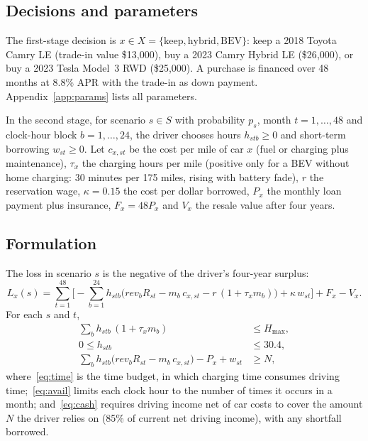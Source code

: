\documentclass[11pt]{article}
\begin{document}
\subsection{Decisions and parameters}

The first-stage decision is $x \in X = \{\text{keep}, \text{hybrid}, \text{BEV}\}$: keep a 2018 Toyota Camry LE (trade-in value \$13{,}000), buy a 2023 Camry Hybrid LE (\$26{,}000), or buy a 2023 Tesla Model~3 RWD (\$25{,}000). A purchase is financed over 48 months at 8.8\% APR with the trade-in as down payment. Appendix~\ref{app:params} lists all parameters.

In the second stage, for scenario $s \in S$ with probability $p_s$, month $t = 1,\dots,48$ and clock-hour block $b = 1,\dots,24$, the driver chooses hours $h_{stb} \geq 0$ and short-term borrowing $w_{st} \geq 0$. Let $c_{x,st}$ be the cost per mile of car $x$ (fuel or charging plus maintenance), $\tau_x$ the charging hours per mile (positive only for a BEV without home charging: 30 minutes per 175 miles, rising with battery fade), $r$ the reservation wage, $\kappa = 0.15$ the cost per dollar borrowed, $P_x$ the monthly loan payment plus insurance, $F_x = 48P_x$ and $V_x$ the resale value after four years.

\subsection{Formulation}

The loss in scenario $s$ is the negative of the driver's four-year surplus:
\begin{equation}\label{eq:loss}
L_x(s) = \sum_{t=1}^{48}\Big[-\sum_{b=1}^{24} h_{stb}\big(\mathit{rev}_b R_{st} - m_b\, c_{x,st} - r\,(1+\tau_x m_b)\big) + \kappa\, w_{st}\Big] + F_x - V_x .
\end{equation}
For each $s$ and $t$,
\begin{align}
\sum_{b} h_{stb}\,(1+\tau_x m_b) &\leq H_{\max}, \label{eq:time}\\
0 \leq h_{stb} &\leq 30.4, \label{eq:avail}\\
\sum_{b} h_{stb}\big(\mathit{rev}_b R_{st} - m_b\, c_{x,st}\big) - P_x + w_{st} &\geq N, \label{eq:cash}
\end{align}
where~\eqref{eq:time} is the time budget, in which charging time consumes driving time;~\eqref{eq:avail} limits each clock hour to the number of times it occurs in a month; and~\eqref{eq:cash} requires driving income net of car costs to cover the amount $N$ the driver relies on (85\% of current net driving income), with any shortfall borrowed.
\end{document}
